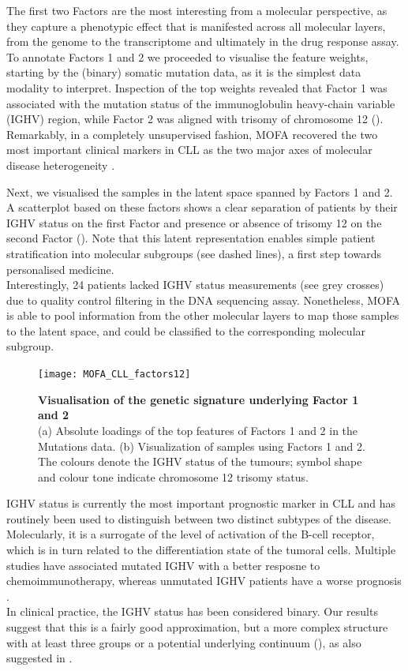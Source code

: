 The first two Factors are the most interesting from a molecular perspective, as they capture a phenotypic effect that is manifested across all molecular layers, from the genome to the transcriptome and ultimately in the drug response assay.\\
To annotate Factors 1 and 2 we proceeded to visualise the feature weights, starting by the (binary) somatic mutation data, as it is the simplest data modality to interpret. Inspection of the top weights revealed that Factor 1 was associated with the mutation status of the immunoglobulin heavy-chain variable (IGHV) region, while Factor 2 was aligned with trisomy of chromosome 12 ().\\
Remarkably, in a completely unsupervised fashion, MOFA recovered the two most important clinical markers in CLL as the two major axes of molecular disease heterogeneity \cite{Fabbri2016,Bulian2017,Crombie2017}.

Next, we visualised the samples in the latent space spanned by Factors 1 and 2. A scatterplot based on these factors shows a clear separation of patients by their IGHV status on the first Factor and presence or absence of trisomy 12 on the second Factor (). Note that this latent representation enables simple patient stratification into molecular subgroups (see dashed lines), a first step towards personalised medicine.\\
Interestingly, 24 patients lacked IGHV status measurements (see grey crosses) due to quality control filtering in the DNA sequencing assay. Nonetheless, MOFA is able to pool information from the other molecular layers to map those samples to the latent space, and could be classified to the corresponding molecular subgroup.

\begin{figure}[H]
	\centering 	
	\texttt{[image: MOFA\_CLL\_factors12]}
	\caption{\textbf{Visualisation of the genetic signature underlying Factor 1 and 2}\\
	(a) Absolute loadings of the top features of Factors 1 and 2 in the Mutations data.
	(b) Visualization of samples using Factors 1 and 2. The colours denote the IGHV status of the tumours; symbol shape and colour tone indicate chromosome 12 trisomy status.
	}
	\label{fig:MOFA_CLL_factors12}
\end{figure}

IGHV status is currently the most important prognostic marker in CLL and has routinely been used to distinguish between two distinct subtypes of the disease\cite{Fabbri2016}. Molecularly, it is a surrogate of the level of activation of the B-cell receptor, which is in turn related to the differentiation state of the tumoral cells. Multiple studies have associated mutated IGHV with a better resposne to chemoimmunotherapy, whereas unmutated IGHV patients have a worse prognosis \cite{Fabbri2016,Bulian2017,Crombie2017}.\\
In clinical practice, the IGHV status has been considered binary. Our results suggest that this is a fairly good approximation, but a more complex structure with at least three groups or a potential underlying continuum (), as also suggested in \cite{Queiros2015}.


